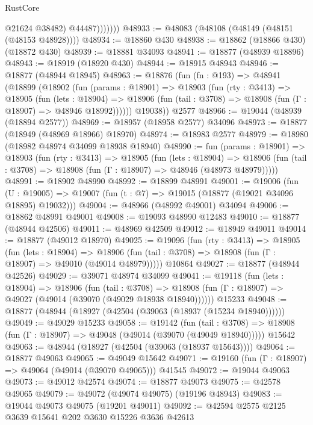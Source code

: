 \begin{lexlean}{RustCore}
\begin{coremodule}
                    @21624
                    @38482)
                  @44487)))))))
@48933 := @48083 (@48108 (@48149 (@48151 (@48153 @48928))))
@48934 := @18860 @430
@48938 := @18862 (@18866 @430) (@18872 @430)
@48939 := @18881 @34093
@48941 := @18877 (@48939 @18896)
@48943 := @18919 (@18920 @430)
@48944 := @18915 @48943
@48946 := @18877 (@48944 @18945)
@48963 := @18876
    (fun (fn : @193) =>
    @48941
      (@18899
        (@18902
          (fun (params : @18901) =>
          @18903
            (fun (rty : @3413) =>
            @18905
              (fun (lets : @18904) =>
              @18906 (fun (tail : @3708) => @18908 (fun (Γ : @18907) => @48946 @18992))))))
        @19038))
    @2577
@48966 := @19044 (@48939 (@18894 @2577))
@48969 := @18957 (@18958 @2577) @34096
@48973 := @18877 (@18949 (@48969 @18966) @18970)
@48974 := @18983 @2577
@48979 := @18980 (@18982 @48974 @34099 @18938 @18940)
@48990 := fun (params : @18901) =>
  @18903
    (fun (rty : @3413) =>
    @18905
      (fun (lets : @18904) =>
      @18906 (fun (tail : @3708) => @18908 (fun (Γ : @18907) => @48946 (@48973 @48979)))))
@48991 := @18902 @48990
@48992 := @18899 @48991
@49001 := @19006
    (fun (U : @19005) => @19007 (fun (t : @7) => @19015 (@18877 (@19021 @34096 @18895) @19032)))
@49004 := @48966 (@48992 @49001) @34094
@49006 := @18862 @48991 @49001
@49008 := @19093 @48990 @12483
@49010 := @18877 (@48944 @42506)
@49011 := @48969 @42509
@49012 := @18949 @49011
@49014 := @18877 (@49012 @18970)
@49025 := @19096
    (fun (rty : @3413) =>
    @18905
      (fun (lets : @18904) =>
      @18906 (fun (tail : @3708) => @18908 (fun (Γ : @18907) => @49010 (@49014 @48979)))))
    @10864
@49027 := @18877 (@48944 @42526)
@49029 := @39071 @48974 @34099
@49041 := @19118
    (fun (lets : @18904) =>
    @18906
      (fun (tail : @3708) =>
      @18908 (fun (Γ : @18907) => @49027 (@49014 (@39070 (@49029 @18938 @18940))))))
    @15233
@49048 := @18877 (@48944 (@18927 (@42504 (@39063 (@18937 (@15234 @18940))))))
@49049 := @49029 @15233
@49058 := @19142
    (fun (tail : @3708) => @18908 (fun (Γ : @18907) => @49048 (@49014 (@39070 (@49049 @18940)))))
    @15642
@49063 := @48944 (@18927 (@42504 (@39063 (@18937 @15643))))
@49064 := @18877 @49063
@49065 := @49049 @15642
@49071 := @19160 (fun (Γ : @18907) => @49064 (@49014 (@39070 @49065))) @41545
@49072 := @19044 @49063
@49073 := @49012 @42574
@49074 := @18877 @49073
@49075 := @42578 @49065
@49079 := @49072 (@49074 @49075) (@19196 @48943)
@49083 := @19044 @49073 @49075 (@19201 @49011)
@49092 := @42594 @2575 @2125 @3639 @15641 @202 @3630 @15226 @3636 @42613

\end{coremodule}
\end{lexlean}
